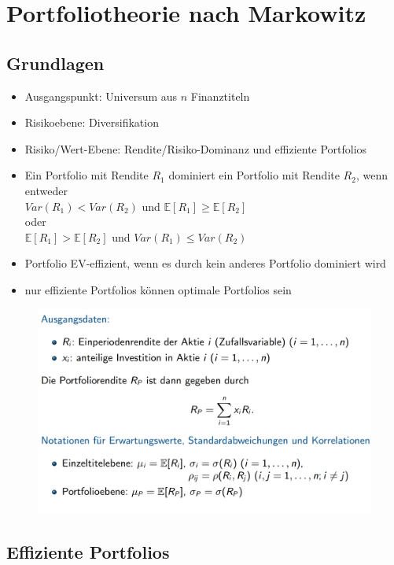 \documentclass[12pt]{report}
\theoremstyle{dotless}
\theoremstyle{definition}
\begin{document}
\section{Portfoliotheorie nach Markowitz}

\subsection{Grundlagen}

\begin{itemize}
	\item Ausgangspunkt: Universum aus $n$ Finanztiteln
	\item Risikoebene: Diversifikation
	\item Risiko/Wert-Ebene: Rendite/Risiko-Dominanz und effiziente Portfolios
	\item Ein Portfolio mit Rendite $R_1$ dominiert ein Portfolio mit Rendite $R_2$, wenn entweder \\ $Var(R_1) < Var(R_2)$ und $\mathbb{E}[R_1] \geq \mathbb{E}[R_2]$ \\ oder \\ $\mathbb{E}[R_1] > \mathbb{E}[R_2]$ und $Var(R_1) \leq Var(R_2)$
	\item Portfolio EV-effizient, wenn es durch kein anderes Portfolio dominiert wird
	\item nur effiziente Portfolios k\"onnen optimale Portfolios sein
\end{itemize}

\begin{figure}[H]
\centering
\includegraphics[width=\textwidth]{Bilder/Ausgangsdaten.png}
\end{figure}

\subsection{Effiziente Portfolios}
\end{document}
